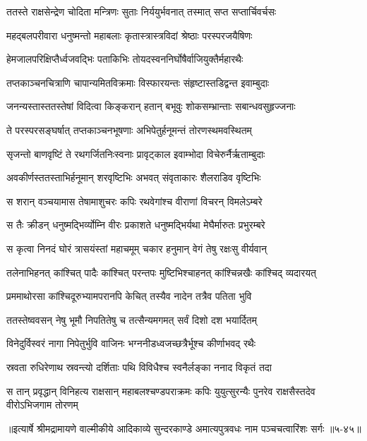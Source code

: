 
\twolineshloka
{ततस्ते राक्षसेन्द्रेण चोदिता मन्त्रिणः सुताः}
{निर्ययुर्भवनात् तस्मात् सप्त सप्तार्चिवर्चसः} %

\twolineshloka
{महद्बलपरीवारा धनुष्मन्तो महाबलाः}
{कृतास्त्रास्त्रविदां श्रेष्ठाः परस्परजयैषिणः} %

\twolineshloka
{हेमजालपरिक्षिप्तैर्ध्वजवद्भिः पताकिभिः}
{तोयदस्वननिर्घोषैर्वाजियुक्तैर्महारथैः} %

\twolineshloka
{तप्तकाञ्चनचित्राणि चापान्यमितविक्रमाः}
{विस्फारयन्तः संहृष्टास्तडिद्वन्त इवाम्बुदाः} %

\twolineshloka
{जनन्यस्तास्ततस्तेषां विदित्वा किङ्करान् हतान्}
{बभूवुः शोकसम्भ्रान्ताः सबान्धवसुहृज्जनाः} %

\twolineshloka
{ते परस्परसङ्घर्षात् तप्तकाञ्चनभूषणाः}
{अभिपेतुर्हनूमन्तं तोरणस्थमवस्थितम्} %

\twolineshloka
{सृजन्तो बाणवृष्टिं ते रथगर्जितनिःस्वनाः}
{प्रावृट्काल इवाम्भोदा विचेरुर्नैर्ऋताम्बुदाः} %

\twolineshloka
{अवकीर्णस्ततस्ताभिर्हनूमान् शरवृष्टिभिः}
{अभवत् संवृताकारः शैलराडिव वृष्टिभिः} %

\twolineshloka
{स शरान् वञ्चयामास तेषामाशुचरः कपिः}
{रथवेगांश्च वीराणां विचरन् विमलेऽम्बरे} %

\twolineshloka
{स तैः क्रीडन् धनुष्मद्भिर्व्योम्नि वीरः प्रकाशते}
{धनुष्मद्भिर्यथा मेघैर्मारुतः प्रभुरम्बरे} %

\twolineshloka
{स कृत्वा निनदं घोरं त्रासयंस्तां महाचमूम्}
{चकार हनुमान् वेगं तेषु रक्षःसु वीर्यवान्} %

\twolineshloka
{तलेनाभिहनत् कांश्चित् पादैः कांश्चित् परन्तपः}
{मुष्टिभिश्चाहनत् कांश्चिन्नखैः कांश्चिद् व्यदारयत्} %

\twolineshloka
{प्रममाथोरसा कांश्चिदूरुभ्यामपरानपि}
{केचित् तस्यैव नादेन तत्रैव पतिता भुवि} %

\twolineshloka
{ततस्तेष्ववसन् नेषु भूमौ निपतितेषु च}
{तत्सैन्यमगमत् सर्वं दिशो दश भयार्दितम्} %

\twolineshloka
{विनेदुर्विस्वरं नागा निपेतुर्भुवि वाजिनः}
{भग्ननीडध्वजच्छत्रैर्भूश्च कीर्णाभवद् रथैः} %

\twolineshloka
{स्रवता रुधिरेणाथ स्रवन्त्यो दर्शिताः पथि}
{विविधैश्च स्वनैर्लङ्का ननाद विकृतं तदा} %

\twolineshloka
{स तान् प्रवृद्धान् विनिहत्य राक्षसान् महाबलश्चण्डपराक्रमः कपिः}
{युयुत्सुरन्यैः पुनरेव राक्षसैस्तदेव वीरोऽभिजगाम तोरणम्} %


॥इत्यार्षे श्रीमद्रामायणे वाल्मीकीये आदिकाव्ये सुन्दरकाण्डे अमात्यपुत्रवधः नाम पञ्चचत्वारिंशः सर्गः ॥५-४५॥
